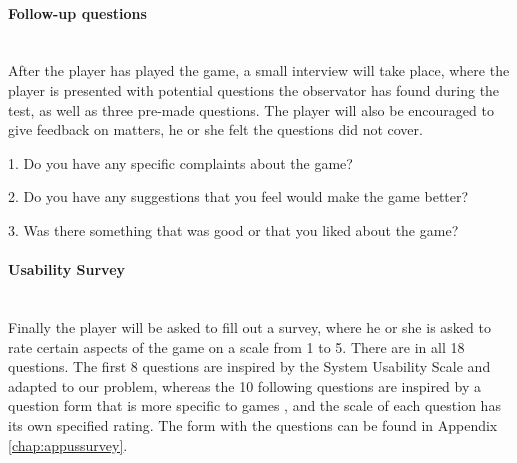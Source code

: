 	\paragraph{Follow-up questions}\mbox{}\\

		After the player has played the game, a small interview will take place, where the player is presented with potential questions the observator has found during the test, as well as three pre-made questions. The player will also be encouraged to give feedback on matters, he or she felt the questions did not cover.

		1. Do you have any specific complaints about the game?

		2. Do you have any suggestions that you feel would make the game better?

		3. Was there something that was good or that you liked about the game?

	\paragraph{Usability Survey}\mbox{}\\

		Finally the player will be asked to fill out a survey, where he or she is asked to rate certain aspects of the game on a scale from 1 to 5. There are in all 18 questions. The first 8 questions are inspired by the System Usability Scale \cite{sus} and adapted to our problem, whereas the 10 following questions are inspired by a question form that is more specific to games \cite{evaluationSheet}, and the scale of each question has its own specified rating. The form with the questions can be found in Appendix \ref{chap:appussurvey}.


